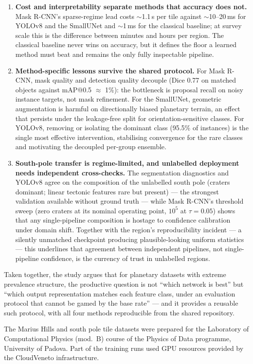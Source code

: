 \begin{enumerate}
    \item \textbf{Cost and interpretability separate methods that accuracy does not.} Mask R-CNN's sparse-regime lead costs $\sim$1.1\,s per tile against $\sim$10--20\,ms for YOLOv8 and the SmallUNet and $\sim$1\,ms for the classical baseline; at survey scale this is the difference between minutes and hours per region. The classical baseline never wins on accuracy, but it defines the floor a learned method must beat and remains the only fully inspectable pipeline.

    \item \textbf{Method-specific lessons survive the shared protocol.} For Mask R-CNN, mask quality and detection quality decouple (Dice 0.77 on matched objects against mAP@0.5 $\approx$ 1\%): the bottleneck is proposal recall on noisy instance targets, not mask refinement. For the SmallUNet, geometric augmentation is harmful on directionally biased planetary terrain, an effect that persists under the leakage-free split for orientation-sensitive classes. For YOLOv8, removing or isolating the dominant class (95.5\% of instances) is the single most effective intervention, stabilising convergence for the rare classes and motivating the decoupled per-group ensemble.

    \item \textbf{South-pole transfer is regime-limited, and unlabelled deployment needs independent cross-checks.} The segmentation diagnostics and YOLOv8 agree on the composition of the unlabelled south pole (craters dominant; linear tectonic features rare but present) --- the strongest validation available without ground truth --- while Mask R-CNN's threshold sweep (zero craters at its nominal operating point, $10^5$ at $\tau=0.05$) shows that any single-pipeline composition is hostage to confidence calibration under domain shift. Together with the region's reproducibility incident --- a silently unmatched checkpoint producing plausible-looking uniform statistics --- this underlines that agreement between independent pipelines, not single-pipeline confidence, is the currency of trust in unlabelled regions.
\end{enumerate}

Taken together, the study argues that for planetary datasets with extreme prevalence structure, the productive question is not ``which network is best'' but ``which output representation matches each feature class, under an evaluation protocol that cannot be gamed by the base rate'' --- and it provides a reusable such protocol, with all four methods reproducible from the shared repository.

\begin{acknowledgements}
      The Marius Hills and south pole tile datasets were prepared for the Laboratory of Computational Physics (mod.~B) course of the Physics of Data programme, University of Padova. Part of the training runs used GPU resources provided by the CloudVeneto infrastructure.
\end{acknowledgements}
